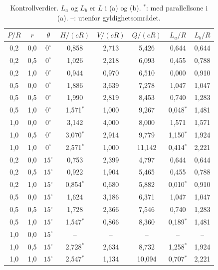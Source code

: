 \documentclass[11pt,a4paper]{article}
\begin{document}
\begin{table}[h]
  \centering
  \caption{Kontrollverdier.  $L_a$ og $L_b$ er $L$ i (a) og (b).
    $^*$: med parallellsone i (a).  --: utenfor gyldighetsområdet.}
  \label{tab:values}
  \begin{tabular}{ccc ccc cc}
    \toprule
    $P/R$ & $r$ & $\theta$ & $H/(cR)$ & $V/(cR)$ & $Q/(cR)$ & $L_a/R$ & $L_b/R$ \\
    \midrule
    0{,}2 & 0{,}0 & $0^\circ$ & 0{,}858 & 2{,}713 & 5{,}426 & 0{,}644 & 0{,}644 \\
    0{,}2 & 0{,}5 & $0^\circ$ & 1{,}026 & 2{,}218 & 6{,}093 & 0{,}455 & 0{,}788 \\
    0{,}2 & 1{,}0 & $0^\circ$ & 0{,}944 & 0{,}970 & 6{,}510 & 0{,}000 & 0{,}910 \\
    0{,}5 & 0{,}0 & $0^\circ$ & 1{,}886 & 3{,}639 & 7{,}278 & 1{,}047 & 1{,}047 \\
    0{,}5 & 0{,}5 & $0^\circ$ & 1{,}990 & 2{,}819 & 8{,}453 & 0{,}740 & 1{,}283 \\
    0{,}5 & 1{,}0 & $0^\circ$ & 1{,}571$^*$ & 1{,}000 & 9{,}267 & 0{,}048$^*$ & 1{,}481 \\
    1{,}0 & 0{,}0 & $0^\circ$ & 3{,}142 & 4{,}000 & 8{,}000 & 1{,}571 & 1{,}571 \\
    1{,}0 & 0{,}5 & $0^\circ$ & 3{,}070$^*$ & 2{,}914 & 9{,}779 & 1{,}150$^*$ & 1{,}924 \\
    1{,}0 & 1{,}0 & $0^\circ$ & 2{,}571$^*$ & 1{,}000 & 11{,}142 & 0{,}414$^*$ & 2{,}221 \\
    \midrule
    0{,}2 & 0{,}0 & $15^\circ$ & 0{,}753 & 2{,}399 & 4{,}797 & 0{,}644 & 0{,}644 \\
    0{,}2 & 0{,}5 & $15^\circ$ & 0{,}922 & 1{,}904 & 5{,}465 & 0{,}455 & 0{,}788 \\
    0{,}2 & 1{,}0 & $15^\circ$ & 0{,}854$^*$ & 0{,}680 & 5{,}882 & 0{,}010$^*$ & 0{,}910 \\
    0{,}5 & 0{,}0 & $15^\circ$ & 1{,}624 & 3{,}186 & 6{,}371 & 1{,}047 & 1{,}047 \\
    0{,}5 & 0{,}5 & $15^\circ$ & 1{,}728 & 2{,}366 & 7{,}546 & 0{,}740 & 1{,}283 \\
    0{,}5 & 1{,}0 & $15^\circ$ & 1{,}547$^*$ & 0{,}866 & 8{,}360 & 0{,}189$^*$ & 1{,}481 \\
    1{,}0 & 0{,}0 & $15^\circ$ & -- & -- & -- & -- & -- \\
    1{,}0 & 0{,}5 & $15^\circ$ & 2{,}728$^*$ & 2{,}634 & 8{,}732 & 1{,}258$^*$ & 1{,}924 \\
    1{,}0 & 1{,}0 & $15^\circ$ & 2{,}547$^*$ & 1{,}134 & 10{,}094 & 0{,}707$^*$ & 2{,}221 \\
    \bottomrule
  \end{tabular}
\end{table}
\end{document}
